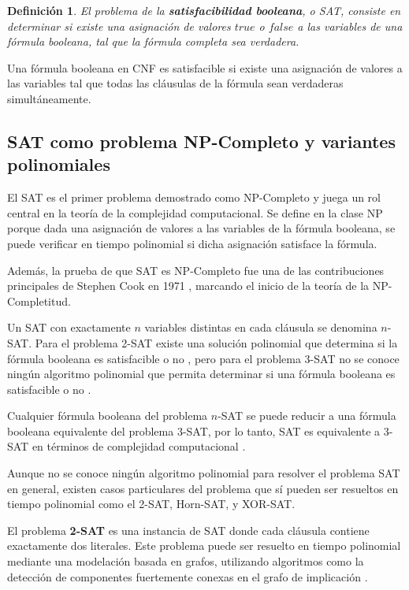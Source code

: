 \documentclass[12pt]{article}
\newtheorem{definition}{Definición}
\begin{document}
\begin{definition}  
  El problema de la \textbf{satisfacibilidad booleana}, o SAT, consiste en determinar si existe una asignación de valores \( true \) o \( false \) a las variables de una fórmula booleana, tal que la fórmula completa sea verdadera. 
\end{definition}

Una fórmula booleana en CNF es satisfacible si existe una asignación de valores a las variables tal que todas las cláusulas de la fórmula sean verdaderas simultáneamente.

\subsection{SAT como problema NP-Completo y variantes polinomiales}

El SAT es el primer problema demostrado como NP-Completo \cite{authomataTheory} y juega un rol central en la teoría de la complejidad computacional. Se define en la clase NP porque dada una asignación de valores a las variables de la fórmula booleana, se puede verificar en tiempo polinomial si dicha asignación satisface la fórmula.

Además, la prueba de que SAT es NP-Completo fue una de las contribuciones principales de Stephen Cook en 1971 \cite{Cook1971}, marcando el inicio de la teoría de la NP-Completitud.

Un SAT con exactamente $n$ variables distintas en cada cláusula se denomina $n$-SAT. Para el problema 2-SAT existe una solución polinomial que determina si la fórmula booleana es satisfacible o no \cite{2satbib}, pero para el problema 3-SAT no se conoce ningún algoritmo polinomial que permita
determinar si una fórmula booleana es satisfacible o no \cite{authomataTheory}.

Cualquier fórmula booleana del problema $n$-SAT se puede reducir a una fórmula booleana equivalente del problema 3-SAT,
por lo tanto, SAT es equivalente a 3-SAT en términos de complejidad computacional \cite{authomataTheory}.

Aunque no se conoce ningún algoritmo polinomial para resolver el problema SAT en general,
existen casos particulares del problema que sí pueden ser resueltos en tiempo polinomial como el 2-SAT, Horn-SAT, y XOR-SAT.


El problema \textbf{2-SAT} es una instancia de SAT donde cada cláusula contiene exactamente dos literales.  Este problema puede ser resuelto en tiempo polinomial mediante una modelación basada en grafos, utilizando algoritmos como la detección de componentes fuertemente conexas en el grafo de implicación \cite{2satbib}.
\end{document}
